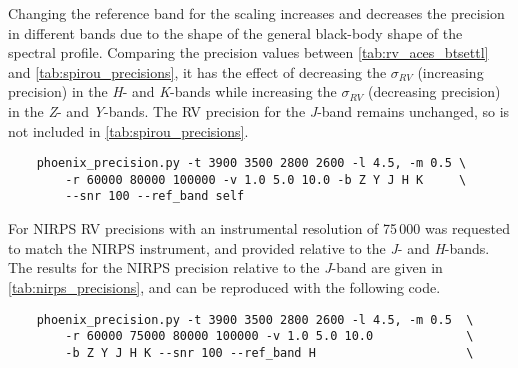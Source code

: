 Changing the reference band for the \snr{} scaling increases and decreases the precision in different bands due to the shape of the general black-body shape of the spectral profile.
Comparing the precision values between \cref{tab:rv_aces_btsettl} and \cref{tab:spirou_precisions}, it has the effect of decreasing the $\sigma_{RV}$ (increasing precision) in the \emph{H}- and \emph{K}-bands while increasing the $\sigma_{RV}$ (decreasing precision) in the \emph{Z}- and \emph{Y}-bands.
The {RV} precision for the \emph{J}-band remains unchanged, so is not included in \cref{tab:spirou_precisions}.

\begin{lstlisting}
    phoenix_precision.py -t 3900 3500 2800 2600 -l 4.5, -m 0.5 \
        -r 60000 80000 100000 -v 1.0 5.0 10.0 -b Z Y J H K     \
        --snr 100 --ref_band self
\end{lstlisting}


For {NIRPS} {RV} precisions with an instrumental resolution of 75\,000 was requested to match the {NIRPS} instrument, and provided relative to the \emph{J}- and \emph{H}-bands.
The results for the {NIRPS} precision relative to the \emph{J}-band are given in \cref{tab:nirps_precisions}, and can be reproduced with the following code.

\begin{lstlisting}
    phoenix_precision.py -t 3900 3500 2800 2600 -l 4.5, -m 0.5  \
        -r 60000 75000 80000 100000 -v 1.0 5.0 10.0             \
        -b Z Y J H K --snr 100 --ref_band H                     \
\end{lstlisting}








